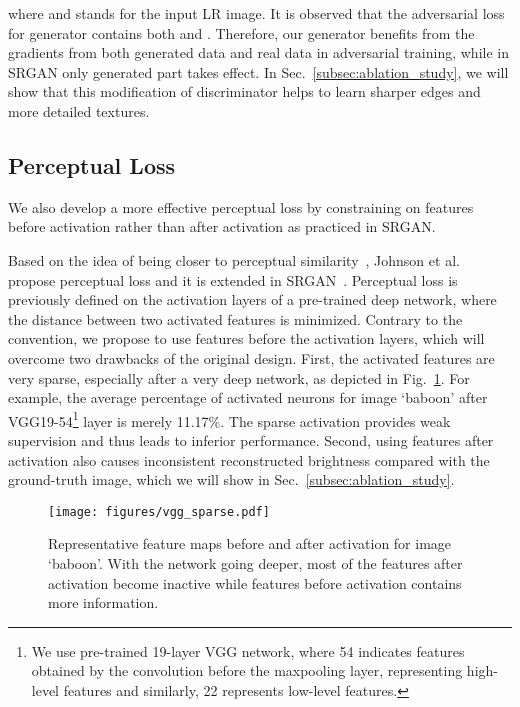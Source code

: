 \documentclass[runningheads]{llncs}
\begin{document}
where  and  stands for the input LR image. 
It is observed that the adversarial loss for generator contains both  and .
Therefore, our generator benefits from the gradients from both generated data and real data in adversarial training, 
while in SRGAN only generated part takes effect. 
In Sec.~\ref{subsec:ablation_study}, we will show that this modification of discriminator helps to learn sharper edges 
and more detailed textures.

\subsection{Perceptual Loss} \label{subsec:perceptual_loss}

We also develop a more effective perceptual loss  by constraining on features before activation rather 
than after activation as practiced in SRGAN.

Based on the idea of being closer to perceptual similarity~\cite{gatys2015texture,bruna2015super}, Johnson et  
al.~\cite{johnson2016perceptual} propose perceptual loss and it is extended in SRGAN~\cite{ledig2017photo}.
Perceptual loss is previously defined on the activation layers of a pre-trained deep network, where the distance  
between two activated features is minimized. Contrary to the convention, we propose to use features before the 
activation layers, which will overcome two drawbacks of the original design.
First, the activated features are very sparse, especially after a very deep network, as depicted in 
Fig.~\ref{fig:vgg_sparse}.
For example, the average percentage of activated neurons for image `baboon' after VGG19-54\footnote{We use pre-trained 
	19-layer VGG network\cite{simonyan2014very}, where 54 indicates features obtained by the  convolution 
	before 
	the  maxpooling layer, representing high-level features and similarly, 22 represents low-level features.} 
	layer 
is merely 11.17\%.
The sparse activation provides weak supervision and thus leads to inferior performance.
Second, using features after activation also causes inconsistent reconstructed brightness compared with the 
ground-truth image, which we will show in Sec.~\ref{subsec:ablation_study}.


\begin{figure}[htbp]
	\vspace{-0.2cm}
	\begin{center}
		\texttt{[image: figures/vgg\_sparse.pdf]}
	\end{center}
	\vspace{-0.5cm}
	\caption{Representative feature maps before and after activation for image `baboon'. With the network going deeper, 
		most of the features after activation become inactive while features before activation contains more 
		information.}
	\label{fig:vgg_sparse}
	\vspace{-0.5cm}
\end{figure}
\end{document}
